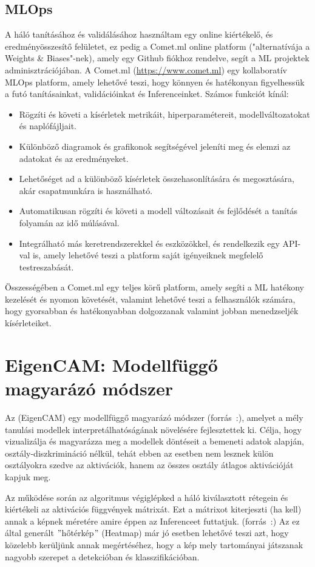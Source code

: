 \documentclass[12pt,oneside,a4paper]{article}
\newcommand{\newsection}[1]{\clearpage\section{#1}}\label{makro}
\theoremstyle{remark}
\begin{document}
	\subsection{MLOps}\label{subsec:MLOps}
	A háló tanításához és validálásához használtam egy online kiértékelő, és eredményösszesítő felületet, ez pedig a Comet.ml online platform ("alternatívája a Weights \& Biases"-nek), amely egy Github fiókhoz rendelve, segít a \ac{ML} projektek adminisztrációjában.
	A Comet.ml (\url{https://www.comet.ml}) egy kollaboratív \ac{MLOps} platform, amely lehetővé teszi, hogy könnyen és
	hatékonyan figyelhessük a futó tanításainkat, validációinkat és \gls{Inference}inket.
	Számos funkciót kínál:
	\begin{itemize}
		\item Rögzíti és követi a kísérletek metrikáit, hiperparamétereit, modellváltozatokat és naplófájljait.
		\item Különböző diagramok és grafikonok segítségével jeleníti meg és elemzi az adatokat és az eredményeket.
		\item Lehetőséget ad a különböző kísérletek összehasonlítására és megosztására, akár csapatmunkára is használható.
		\item Automatikusan rögzíti és követi a modell változásait és fejlődését a tanítás folyamán az idő múlásával.
		\item Integrálható más keretrendszerekkel és eszközökkel, és rendelkezik egy API-val is, amely lehetővé teszi a platform
		saját igényeiknek megfelelő testreszabását.
	\end{itemize}
	Összességében a Comet.ml egy teljes körű platform, amely segíti a \ac{ML} hatékony kezelését
	és nyomon követését, valamint lehetővé teszi a felhasználók számára, hogy gyorsabban és hatékonyabban dolgozzanak
	valamint jobban menedzseljék kísérleteiket.
	
	\newsection{EigenCAM: Modellfüggő magyarázó módszer}\label{sec:eigencam:-modellfuggo-magyarazo}
	Az  (\gls{EigenCAM}) egy modellfüggő magyarázó módszer (forrás~\cite{pytorch-grad-cam}:), amelyet a mély tanulási
	modellek interpretálhatóságának növelésére fejlesztettek ki.
	Célja, hogy vizualizálja és magyarázza meg a modellek döntéseit a bemeneti adatok alapján,
	osztály-diszkrimináció nélkül, tehát ebben az esetben nem lesznek külön osztályokra szedve az aktivációk, hanem az
	összes osztály átlagos aktivációját kapjuk meg.
	
	Az  működése során az algoritmus végiglépked a háló kiválasztott rétegein és kiértékeli
	az aktivációs függvények mátrixát.
	Ezt a mátrixot kiterjeszti (ha kell) annak a képnek méretére amire éppen az \gls{Inference}et futtatjuk.
	(forrás~\cite{muhammad2020eigencam}:)
	Az ez által generált \("\)hőtérkép\("\) (Heatmap) már jó esetben lehetővé teszi azt, hogy közelebb kerüljünk
	annak megértéséhez, hogy a kép mely tartományai játszanak nagyobb szerepet a detekcióban és klasszifikációban.
	
\end{document}
